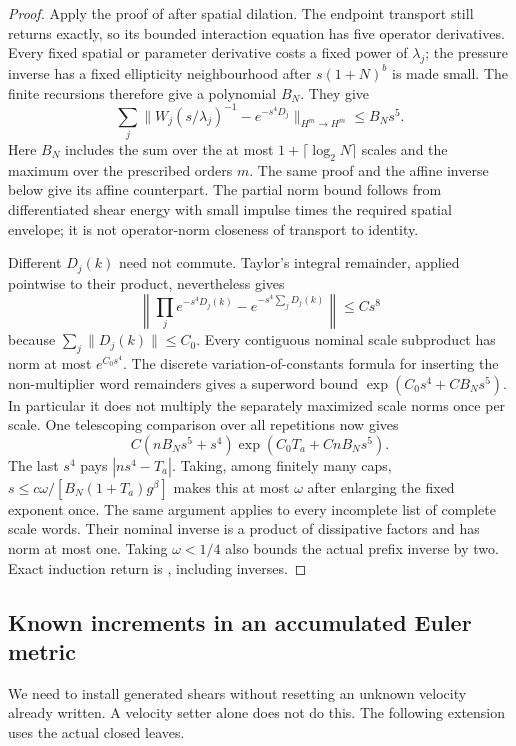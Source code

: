 \documentclass[11pt,a4paper]{amsart}
\theoremstyle{definition}
\theoremstyle{remark}
\numberwithin{equation}{section}
\newcommand{\norm}[1]{\lVert #1\rVert}
\begin{document}
\begin{proof}
Apply the proof of \cite[Proposition~4.5]{Common} after spatial dilation.
The endpoint transport still returns exactly, so its bounded interaction
equation has five operator derivatives.  Every fixed spatial or parameter
derivative costs a fixed power of $\lambda_j$; the pressure inverse has
a fixed ellipticity neighbourhood after $s(1+N)^b$ is made small.
The finite recursions therefore give a polynomial $B_N$.  They give
\[
 \sum_j\norm{W_j(s/\lambda_j)^{-1}-e^{-s^4D_j}}_{H^m\to H^m}
       \le B_Ns^5 .
\]
Here $B_N$ includes the sum over the at most $1+\lceil\log_2N\rceil$
scales and the maximum over the prescribed orders $m$.
The same proof and the affine inverse below give its affine counterpart.
The partial norm bound follows from differentiated shear energy with
small impulse times the required spatial envelope; it is not
operator-norm closeness of transport to identity.

Different $D_j(k)$ need not commute.  Taylor's integral remainder,
applied pointwise to their product, nevertheless gives
\begin{equation}\label{eq:amp-product-error}
 \left\|\prod_je^{-s^4D_j(k)}-e^{-s^4\sum_jD_j(k)}\right\|
       \le Cs^8
\end{equation}
because $\sum_j\norm{D_j(k)}\le C_0$.  Every contiguous nominal scale
subproduct has norm at most $e^{C_0s^4}$.  The discrete
variation-of-constants formula for inserting the non-multiplier word
remainders gives a superword bound
$\exp(C_0s^4+CB_Ns^5)$.  In particular it does not multiply the
separately maximized scale norms once per scale.
One telescoping comparison over all repetitions now gives
\begin{equation}\label{eq:amp-total-word-error}
 C(nB_Ns^5+s^4)
       \exp(C_0T_a+CnB_Ns^5).
\end{equation}
The last $s^4$ pays $|ns^4-T_a|$.
Taking, among finitely many caps,
$s\le c\omega/[B_N(1+T_a)g^\beta]$ makes this at most $\omega$
after enlarging the fixed exponent once.  The same argument applies to
every incomplete list of complete scale words.  Their nominal inverse
is a product of dissipative factors and has norm at most one.
Taking $\omega<1/4$ also bounds the actual prefix inverse by two.
Exact induction return is \cite[Lemma~4.1]{Common}, including inverses.
\end{proof}

\subsection{Known increments in an accumulated Euler metric}
We need to install generated shears without resetting an unknown
velocity already written.  A velocity setter alone does not do this.
The following extension uses the actual closed leaves.
\end{document}

